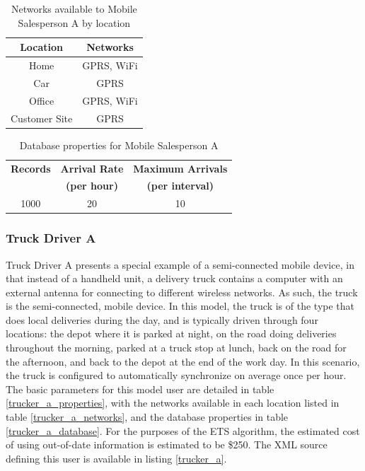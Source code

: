 \begin{table}[htdp]
\begin{center}
\begin{tabular}{|c|c|}
\hline
\textbf{Location} & \textbf{Networks} \\
\hline
Home & GPRS, WiFi \\
\hline
Car & GPRS \\
\hline
Office & GPRS, WiFi \\
\hline
Customer Site & GPRS \\
\hline
\end{tabular}
\end{center}
\caption{Networks available to Mobile Salesperson A by location}
\label{sales_a_networks}
\end{table}

\begin{table}[htdp]
\begin{center}
\begin{tabular}{|c|c|c|}
\hline
\textbf{Records} &\textbf{Arrival Rate} &\textbf{Maximum Arrivals} \\
 &\textbf{(per hour)} &\textbf{(per interval)} \\
\hline
1000 & 20 & 10 \\
\hline
\end{tabular}
\end{center}
\caption{Database properties for Mobile Salesperson A}
\label{sales_a_database}
\end{table}

\subsubsection{Truck Driver A}

Truck Driver A presents a special example of a semi-connected mobile device, in that instead of a handheld unit, a delivery truck contains a computer with an external antenna for connecting to different wireless networks.  As such, the truck is the semi-connected, mobile device.  In this model, the truck is of the type that does local deliveries during the day, and is typically driven through four locations:  the depot where it is parked at night, on the road doing deliveries throughout the morning, parked at a truck stop at lunch, back on the road for the afternoon, and back to the depot at the end of the work day.  In this scenario, the truck is configured to automatically synchronize on average once per hour.  The basic parameters for this model user are detailed in table \ref{trucker_a_properties}, with the networks available in each location listed in table \ref{trucker_a_networks}, and the database properties in table \ref{trucker_a_database}.  For the purposes of the ETS algorithm, the estimated cost of using out-of-date information is estimated to be \$250.  The XML source defining this user is available in listing \ref{trucker_a}.

